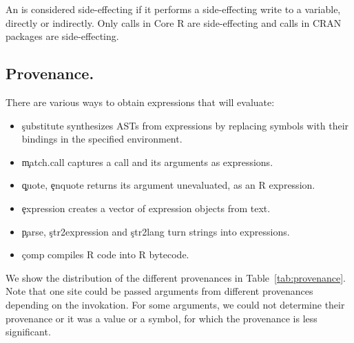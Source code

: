 \documentclass[screen,acmsmall]{acmart}
\begin{document}
An \eval is considered side-effecting if it performs a side-effecting write to a
variable, directly or indirectly. Only \SideEffectingCoreCallPerc \eval calls in
Core R are side-effecting and \SideEffectingPackageCallPerc \eval calls in CRAN
packages are side-effecting.


\subsection{Provenance.}
There are various ways to obtain expressions that \eval will evaluate:
\begin{itemize}
    \item \c{substitute} synthesizes ASTs from expressions by replacing
    symbols with their bindings in the specified environment.
    \item \c{match.call} captures a call and its arguments as expressions.
    \item \c{quote}, \c{enquote} returns its argument unevaluated, as an R expression. %
    \item \c{expression}  creates a vector of expression
    objects from text.
    \item \c{parse}, \c{str2expression} and \c{str2lang} turn strings into
    expressions.
    \item \c{comp} compiles R code into R bytecode.
\end{itemize}
We show the distribution of the different provenances in Table~\ref{tab:provenance}. Note that one site could be passed arguments from different provenances depending on the invokation. For some arguments, we could not determine their provenance or it was a value or a symbol, for which the provenance is less significant. %
\end{document}
